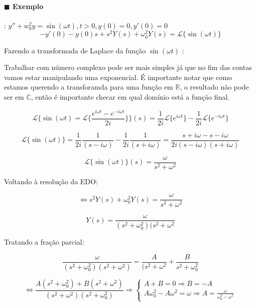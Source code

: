 \paragraph{$\blacksquare$ Exemplo}: \( y'' + w_0^2 y = \sin( \omega t), t > 0, y(0) = 0, y'(0) = 0 \) 
\[ - y'(0) - y(0) s + s^2 Y(s) + \omega_0 ^2 Y(s) = \mathcal{L} \{\sin(\omega t)\}  \]

\item[$\blacksquare$] Fazendo a transformada de Laplace da função \( \sin(\omega t)  \) :

  Trabalhar com número complexo pode ser mais simples já que no fim das contas vamos
  estar manipulando uma exponencial. É importante notar que como estamos querendo a
  transforamda para uma função em \( \mathbb{R} \), o resultado não pode ser em \( \mathbb{C} \),
  então é importante checar em qual domínio está a função final.

  \[ \mathcal{L} \{\sin (\omega t) = \mathcal{L} \bigg\{ \frac{e^{i\omega t} - e^{-i \omega t} }{2i}\bigg\} \}(s) = \frac{1}{2i} \mathcal{L}
    \{e^{i\omega t}\} - \frac{1}{2i} \mathcal{L} \{e^{-i\omega t}\}   \]

  \[ \mathcal{L} \{\sin (\omega t) \}   = \frac{1}{2i}\frac{1}{(s - i \omega)} - \frac{1}{2i} \frac{1}{(s + i \omega)} =
    \frac{s + i \omega - s - i \omega}{2i (s-i\omega)(s + i \omega)} \]

  \[ \mathcal{L} \{\sin(\omega t)\} (s) = \frac{\omega}{s^2 + \omega^2}  \]
  
  

  Voltando à resolução da EDO:


  \[ \Leftrightarrow s^2 Y(s) + \omega_0^2 Y(s) = \frac{\omega}{s^2 + \omega^2}   \]


  \[ Y(s) = \frac{\omega}{(s^2 + \omega_0^2)(s^2 + \omega^2}\]
  \item[$\blacksquare$] Tratando a fração parcial:

    \[  \frac{\omega}{(s^2 + \omega_0^2) (s^2 + \omega^2) }  = \frac{A}{(s^2 + \omega^2} + \frac{B}{s^2 + \omega_0^2} \]

    \[ \Leftrightarrow \frac{A(s^2 + \omega_0^2) + B(s^2 + \omega^2)}{(s^2 + \omega^2)(s^2 + \omega_0^2)} \Rightarrow \begin{cases}
                                                                            A + B = 0 \Rightarrow B = - A \\
                                                                            A\omega_0^2 - A \omega^2 = \omega \Rightarrow A =
                                                                            \frac{\omega}{\omega_0^2 - \omega^2}
                                                                          \end{cases}  \]

